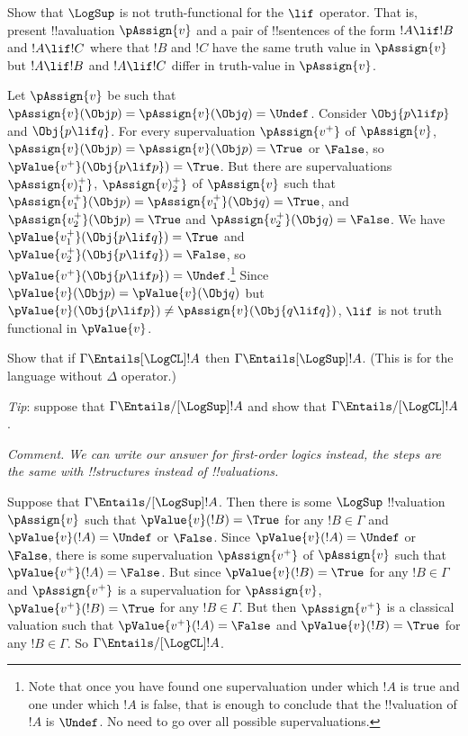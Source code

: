 \documentclass[../../../../include/open-logic-chapter]{subfiles}
\begin{document}


\begin{prob}
	Show that $\LogSup$ is not truth-functional for the $\lif$ operator. That is, present !!a{valuation} $\pAssign{v}$ and a pair of !!{sentence}s of the form $!A \lif !B$ and $!A \lif !C$ where that $!B$ and $!C$ have the same truth value in $\pAssign{v}$ but $!A \lif !B$ and $!A \lif !C$ differ in truth-value in $\pAssign{v}$.
\begin{ans}
	Let $\pAssign{v}$ be such that $\pAssign{v}(\Obj p)=\pAssign{v}(\Obj q)=\Undef$. Consider $\Obj{p \lif p}$ and $\Obj{p \lif q}$. For every supervaluation $\pAssign{v^+}$ of $\pAssign{v}$, $\pAssign{v}(\Obj p)=\pAssign{v}(\Obj p)=\True$ or $\False$, so $\pValue{v^+}(\Obj{p \lif p})=\True$. But there are supervaluations $\pAssign{v)_1^+}$, $\pAssign{v)_2^+}$ of
	$\pAssign{v}$ such that $\pAssign{v_1^+}(\Obj p)=\pAssign{v_1^+}(\Obj q)=\True$, and 
	$\pAssign{v_2^+}(\Obj p)=\True$ and $\pAssign{v_2^+}(\Obj q)=\False$. We have $\pValue{v_1^+}(\Obj{p \lif q})=\True$ and $\pValue{v_2^+}(\Obj{p \lif q})=\False$, so $\pValue{v^+}(\Obj{p \lif p})=\Undef$.\footnote{Note that once you have found one supervaluation under which $!A$ is true and one under which $!A$ is false, that is enough to conclude that the !!{valuation} of $!A$ is $\Undef$. No need to go over all possible supervaluations.} Since $\pValue{v}(\Obj p)=\pValue{v}(\Obj q)$ but $\pValue{v}(\Obj{p \lif p})\neq\pAssign{v}(\Obj{q \lif q})$, $\lif$ is not truth functional in $\pValue{v}$. 
\end{ans}
\end{prob}

\begin{prob}
	Show that if $\Gamma \Entails[\LogCL] !A$ then $\Gamma \Entails[\LogSup] !A$. (This is for the language without $\Delta$ operator.)

	\emph{Tip}: suppose that $\Gamma \Entails/[\LogSup] !A$ and show that $\Gamma \Entails/[\LogCL] !A$.

\begin{ans}
	\emph{Comment. We can write our answer for first-order logics instead, 
	the steps are the same with !!{structure}s instead of !!{valuation}s.}

	Suppose that $\Gamma \Entails/[\LogSup] !A$. Then there is some 
	$\LogSup$ !!{valuation} $\pAssign{v}$ such that $\pValue{v}(!B)=\True$ for any $!B\in\Gamma$ and $\pValue{v}(!A)=\Undef$ or $\False$. Since $\pValue{v}(!A)=\Undef$ or $\False$, there is some supervaluation $\pAssign{v^+}$ of $\pAssign{v}$
	such that $\pValue{v^+}(!A)=\False$. But since $\pValue{v}(!B)=\True$ for any $!B\in\Gamma$ and $\pAssign{v^+}$ is a supervaluation for $\pAssign{v}$, $\pValue{v^+}(!B)=\True$ for any $!B\in\Gamma$. But then  
	$\pAssign{v^+}$ is a classical valuation such that $\pValue{v^+}(!A)=\False$ and 
	$\pValue{v}(!B)=\True$ for any $!B\in\Gamma$. So $\Gamma \Entails/[\LogCL] !A$.

\end{ans}
\end{prob}
\end{document}
